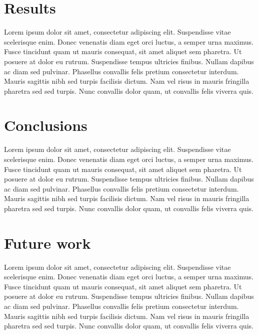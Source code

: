 \documentclass{sig-alternate}
\begin{document}

\section{Results}
Lorem ipsum dolor sit amet, consectetur adipiscing elit. Suspendisse vitae scelerisque enim. Donec venenatis diam eget orci luctus, a semper urna maximus. Fusce tincidunt quam ut mauris consequat, sit amet aliquet sem pharetra. Ut posuere at dolor eu rutrum. Suspendisse tempus ultricies finibus. Nullam dapibus ac diam sed pulvinar. Phasellus convallis felis pretium consectetur interdum. Mauris sagittis nibh sed turpis facilisis dictum. Nam vel risus in mauris fringilla pharetra sed sed turpis. Nunc convallis dolor quam, ut convallis felis viverra quis.


\section{Conclusions}
Lorem ipsum dolor sit amet, consectetur adipiscing elit. Suspendisse vitae scelerisque enim. Donec venenatis diam eget orci luctus, a semper urna maximus. Fusce tincidunt quam ut mauris consequat, sit amet aliquet sem pharetra. Ut posuere at dolor eu rutrum. Suspendisse tempus ultricies finibus. Nullam dapibus ac diam sed pulvinar. Phasellus convallis felis pretium consectetur interdum. Mauris sagittis nibh sed turpis facilisis dictum. Nam vel risus in mauris fringilla pharetra sed sed turpis. Nunc convallis dolor quam, ut convallis felis viverra quis.


\section{Future work}
Lorem ipsum dolor sit amet, consectetur adipiscing elit. Suspendisse vitae scelerisque enim. Donec venenatis diam eget orci luctus, a semper urna maximus. Fusce tincidunt quam ut mauris consequat, sit amet aliquet sem pharetra. Ut posuere at dolor eu rutrum. Suspendisse tempus ultricies finibus. Nullam dapibus ac diam sed pulvinar. Phasellus convallis felis pretium consectetur interdum. Mauris sagittis nibh sed turpis facilisis dictum. Nam vel risus in mauris fringilla pharetra sed sed turpis. Nunc convallis dolor quam, ut convallis felis viverra quis.
\end{document}
